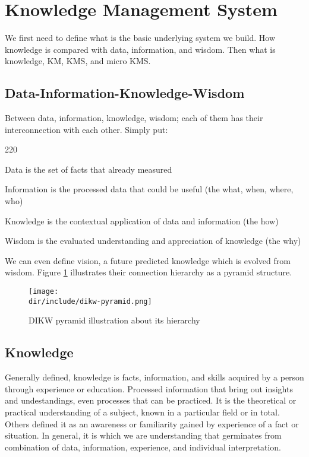 \section{Knowledge Management System}
\label{sec:kms}

We first need to define what is the basic underlying system we build.
How knowledge is compared with data, information, and wisdom.
Then what is knowledge, \ac{KM}, \ac{KMS}, and micro \ac{KMS}.

\subsection{Data-Information-Knowledge-Wisdom}

Between data, information, knowledge, wisdom; each of them has their interconnection with each other. Simply put:

\begin{dinglist}{220}
\item Data is the set of facts that already measured
\item Information is the processed data that could be useful (the what, when, where, who)
\item Knowledge is the contextual application of data and information (the how)
\item Wisdom is the evaluated understanding and appreciation of knowledge (the why)
\end{dinglist}

We can even define vision, a future predicted knowledge which is evolved from wisdom.
Figure \ref{fig:kms:dikw-pyramid} illustrates their connection hierarchy as a pyramid structure.

\begin{figure}[htbp]
    \centering
    \texttt{[image: \\dir/include/dikw-pyramid.png]}
    \caption[DIKW Pyramid]{DIKW pyramid illustration about its hierarchy}
    \label{fig:kms:dikw-pyramid}
\end{figure}

\subsection{Knowledge}

Generally defined, knowledge is facts, information, and skills acquired by a person through experience or education.
Processed information that bring out insights and undestandings, even processes that can be practiced.
It is the theoretical or practical understanding of a subject, known in a particular field or in total.
Others defined it as an awareness or familiarity gained by experience of a fact or situation.
In general, it is which we are understanding that germinates from combination of data, information, experience, and individual interpretation.~\autocite{BD2015Knowledge}

